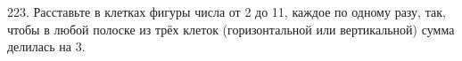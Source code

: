 223. Расставьте в клетках фигуры числа от 2 до 11, каждое по одному разу, так, чтобы в любой полоске из трёх клеток (горизонтальной или вертикальной) сумма делилась на 3.
\begin{center}
\begin{figure}[ht!]
\end{figure}
\end{center}
